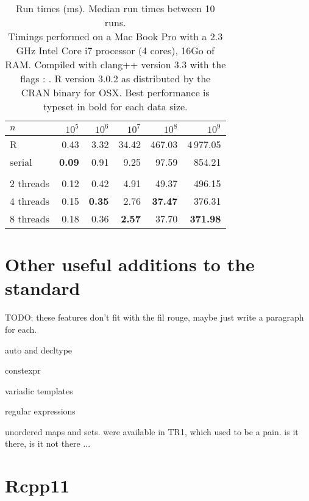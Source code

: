 \begin{table}
\centering
\begin{tabular}{lrrrrr}
\toprule
$n$ & $10^5$ & $10^6$ & $10^7$ & $10^8$ & $10^9$ \\
\midrule
R         & 0.43          & 3.32  & 34.42 & 467.03 & 4\,977.05 \\
serial    & \textbf{0.09} & 0.91  &  9.25 &  97.59 &    854.21 \\
\hspace{1.5cm} &
\hspace{1.5cm} &
\hspace{1.5cm} &
\hspace{1.5cm} &
\hspace{1.5cm} &
\hspace{1.5cm} \\
2 threads & 0.12          & 0.42          & 4.91          &  49.37          & 496.15          \\
4 threads & 0.15          & \textbf{0.35} & 2.76          &  \textbf{37.47} & 376.31          \\
8 threads & 0.18          & 0.36          & \textbf{2.57} &  37.70          & \textbf{371.98} \\
\bottomrule
\end{tabular}
\caption{\label{table:count}Run times (ms). Median run times between 10 runs.\\
{\footnotesize Timings performed on a Mac Book Pro with a 2.3 GHz Intel Core i7 processor (4 cores), 16Go of RAM.
Compiled with clang++ version 3.3 with the flags : . R version 3.0.2
as distributed by the CRAN binary for OSX. Best performance is typeset in bold for each data size. }}
\end{table}

\section{Other useful additions to the standard}

TODO:
these features don't fit with the fil rouge, maybe just write a paragraph for each.

auto and decltype

constexpr

variadic templates

regular expressions

unordered maps and sets. were available in TR1, which used to be a pain. is it there, is it not there ...

\section{Rcpp11}

